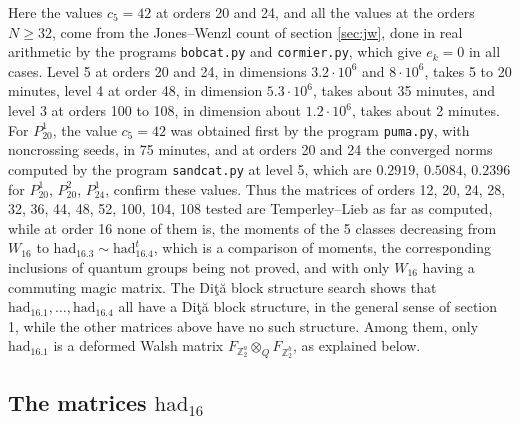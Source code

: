 \documentclass[11pt]{amsart}
\begin{document}
\noindent Here the values $c_5=42$ at orders 20 and 24, and all the values at the orders $N\geq32$, come from the Jones--Wenzl count of section \ref{sec:jw}, done in real arithmetic by the programs \texttt{bobcat.py} and \texttt{cormier.py}, which give $e_k=0$ in all cases. Level 5 at orders 20 and 24, in dimensions $3.2\cdot10^6$ and $8\cdot10^6$, takes 5 to 20 minutes, level 4 at order 48, in dimension $5.3\cdot10^6$, takes about 35 minutes, and level 3 at orders 100 to 108, in dimension about $1.2\cdot10^6$, takes about 2 minutes. For $P_{20}^1$, the value $c_5=42$ was obtained first by the program \texttt{puma.py}, with noncrossing seeds, in 75 minutes, and at orders 20 and 24 the converged norms computed by the program \texttt{sandcat.py} at level 5, which are $0.2919$, $0.5084$, $0.2396$ for $P_{20}^1$, $P_{20}^2$, $P_{24}^1$, confirm these values. Thus the matrices of orders 12, 20, 24, 28, 32, 36, 44, 48, 52, 100, 104, 108 tested are Temperley--Lieb as far as computed, while at order 16 none of them is, the moments of the 5 classes decreasing from $W_{16}$ to $\mathrm{had}_{16.3}\sim\mathrm{had}_{16.4}^t$, which is a comparison of moments, the corresponding inclusions of quantum groups being not proved, and with only $W_{16}$ having a commuting magic matrix. The Di\c t\u a block structure search shows that $\mathrm{had}_{16.1},\ldots,\mathrm{had}_{16.4}$ all have a Di\c t\u a block structure, in the general sense of section 1, while the other matrices above have no such structure. Among them, only $\mathrm{had}_{16.1}$ is a deformed Walsh matrix $F_{\mathbb Z_2^a}\otimes_QF_{\mathbb Z_2^b}$, as explained below.

\subsection{The matrices $\mathrm{had}_{16}$}\label{sec:had16}
\end{document}
